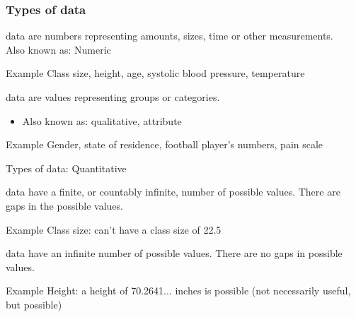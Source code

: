 \documentclass[xcolor=table]{beamer}
\begin{document}
\begin{frame}
\frametitle{Types of data}

\begin{block}{}
\large {} data are numbers representing amounts, sizes, time or other measurements.\\
Also known as: Numeric
\end{block}

\begin{exampleblock}{Example}
Class size, height, age, systolic blood pressure, temperature
\end{exampleblock}

\pause

\begin{block}{}
\large {} data are values representing groups or categories.
\begin{itemize}
\item Also known as: qualitative, attribute
\end{itemize}
\end{block}

\begin{exampleblock}{Example}
Gender, state of residence, football player's numbers, pain scale
\end{exampleblock}

\end{frame}

\begin{frame}{Types of data: Quantitative}
\begin{block}{}
\large {} data have a finite, or countably infinite, number of possible values. There are gaps in the possible values.
\end{block}

\begin{exampleblock}{Example}
Class size: can't have a class size of 22.5
\end{exampleblock}
\pause
\begin{block}{}
\large {} data have an infinite number of possible values. There are no gaps in possible values.
\end{block}

\begin{exampleblock}{Example}
Height: a height of 70.2641... inches is possible (not necessarily useful, but possible)
\end{exampleblock}

\end{frame}
\end{document}
